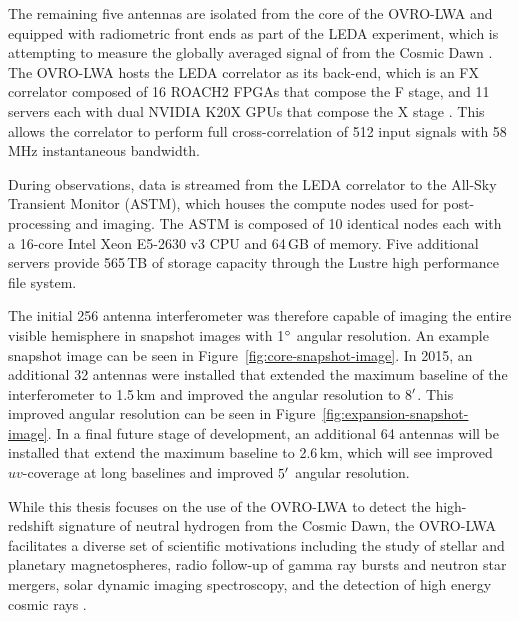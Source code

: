 \begin{bibunit}

The remaining five antennas are isolated from the core of the OVRO-LWA and equipped with radiometric
front ends as part of the LEDA experiment, which is attempting to measure the globally averaged
signal of  from the Cosmic Dawn \citep{2018MNRAS.478.4193P}.  The OVRO-LWA hosts the LEDA
correlator as its back-end, which is an FX correlator composed of 16 ROACH2 FPGAs that compose the F
stage, and 11 servers each with dual NVIDIA K20X GPUs that compose the X stage
\citep{2015JAI.....450003K}. This allows the correlator to perform full cross-correlation of 512
input signals with 58\,MHz instantaneous bandwidth.

During observations, data is streamed from the LEDA correlator to the All-Sky Transient Monitor
(ASTM), which houses the compute nodes used for post-processing and imaging.  The ASTM is composed
of 10 identical nodes each with a 16-core Intel Xeon E5-2630 v3 CPU and 64\,GB of memory. Five
additional servers provide 565\,TB of storage capacity through the Lustre high performance file
system.

The initial 256 antenna interferometer was therefore capable of imaging the entire visible
hemisphere in snapshot images with 1$\mbox{$^\circ$}$ angular resolution. An example snapshot image can be
seen in Figure~\ref{fig:core-snapshot-image}.  In 2015, an additional 32 antennas were installed
that extended the maximum baseline of the interferometer to 1.5\,km and improved the angular
resolution to 8$\mbox{$^\prime$}$. This improved angular resolution can be seen in
Figure~\ref{fig:expansion-snapshot-image}. In a final future stage of development, an additional 64
antennas will be installed that extend the maximum baseline to 2.6\,km, which will see improved
$uv$-coverage at long baselines and improved $5\mbox{$^\prime$}$ angular resolution.

While this thesis focuses on the use of the OVRO-LWA to detect the high-redshift signature of
neutral hydrogen from the Cosmic Dawn, the OVRO-LWA facilitates a diverse set of scientific
motivations including the study of stellar and planetary magnetospheres, radio follow-up of gamma
ray bursts \citep{2017arXiv171106665A} and neutron star mergers, solar dynamic imaging spectroscopy,
and the detection of high energy cosmic rays \citep{caltechthesis11016}.


\end{bibunit}

